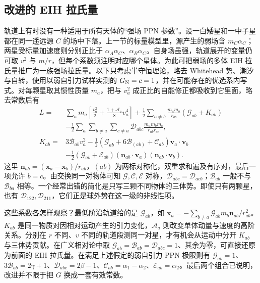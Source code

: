 \subsection{改进的 EIH 拉氏量}

轨道上有时没有一种适用于所有天体的“强场 PPN 参数”。设一白矮星和一中子星都在同一遥远源 $C$ 的场中下落。上一节的标量模型里，源产生的弱场含 $m_C\alpha_C$；两星受标量加速度则分别正比于 $\alpha_A\alpha_C$、$\alpha_B\alpha_C$。自身场虽强，轨道展开的变量仍可取 $v^2$ 与 $m/r$，但每个系数须注明对应哪个星体。为此可把弱场的多体 EIH 拉氏量推广为一族强场拉氏量。以下只考虑半守恒理论，略去 Whitehead 势、潮汐与自转，使用以弱自引力试样实测的 $G_{\rm N}=c=1$，并在可能存在的优选系内写式。对每颗星取其惯性质量 $m_a$，把与 $v_a^2$ 成正比的自能修正都吸收到它里面，略去常数后有
\begin{align*}
 L={}&\sum_a m_a\left[\frac{v_a^2}{2}
              +\frac{1+\mathcal A_a}{8}v_a^4\right]
 +\frac12\sum_{a\ne b}\frac{m_am_b}{r_{ab}}
        \left(\mathcal G_{ab}+K_{ab}\right)\\
 &-\frac12\sum_a\sum_{b\ne a}\sum_{c\ne a}
      \mathcal D_{abc}\frac{m_am_bm_c}{r_{ab}r_{ac}},\\
 K_{ab}={}&3\mathcal B_{ab}v_a^2
 -\frac12\left(\mathcal G_{ab}+6\mathcal B_{(ab)}
                   +\mathcal C_{ab}\right)\bm v_a\cdot\bm v_b\\
 &-\frac12(\mathcal G_{ab}+\mathcal E_{ab})
       (\bm n_{ab}\cdot\bm v_a)(\bm n_{ab}\cdot\bm v_b).
\end{align*}
这里 $\bm n_{ab}=(\bm x_a-\bm x_b)/r_{ab}$，$(ab)$ 为两标对称化，双重求和遍及有序对，最后一项允许 $b=c$。由交换同一对物体可知 $\mathcal G,\mathcal C,\mathcal E$ 对称，$\mathcal D_{abc}=\mathcal D_{acb}$；$\mathcal B_{ab}$ 一般不与 $\mathcal B_{ba}$ 相等。一个经常出错的简化是只写三颗不同物体的三体势。即使只有两颗星，也有 $\mathcal D_{122},\mathcal D_{211}$，它们正是球外势在这一级的非线性项。

这些系数各怎样观察？最低阶沿轨道给的是 $\mathcal G_{ab}$，如 $\ddot{\bm x}_a=-\sum_{b\ne a}\mathcal G_{ab}m_b\bm n_{ab}/r_{ab}^2$。$K_{ab}$ 是同一物质对因相对运动产生的引力变化，$\mathcal A_a$ 则改变单体动量与速度的高阶关系。分别在 $r$ 不同、$v$ 不同的轨道段测同一对星，才有机会从运动中分开 $K_{ab}$ 与三体势贡献。在广义相对论中取 $\mathcal G_{ab}=\mathcal B_{ab}=\mathcal D_{abc}=1$、其余为零，可直接还原为前面的 EIH 拉氏量。在满足上述假定的弱自引力 PPN 极限则有 $\mathcal G_{ab}=1$、$3\mathcal B_{ab}=2\gamma+1$、$\mathcal D_{abc}=2\beta-1$、$\mathcal C_{ab}=\alpha_1-\alpha_2$、$\mathcal E_{ab}=\alpha_2$。最后两个组合已说明，改进并不限于把 $G$ 换成一套有效常数。

